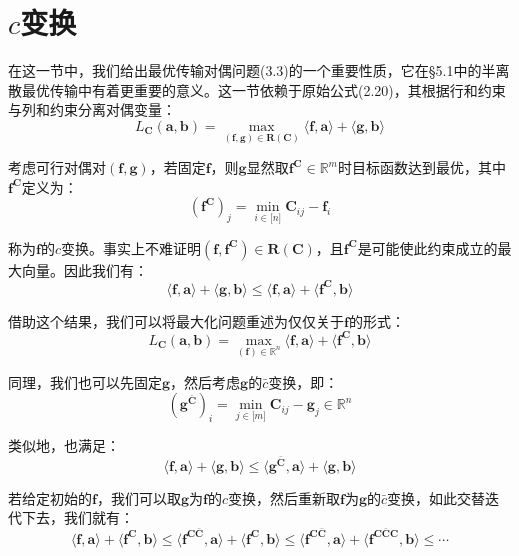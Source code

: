 \documentclass[cn,10pt,math=newtx,citestyle=gb7714-2015,bibstyle=gb7714-2015]{elegantbook}
\begin{document}
\section{$c$变换}

在这一节中，我们给出最优传输对偶问题(3.3)的一个重要性质，它在\S 5.1中的半离散最优传输中有着更重要的意义。这一节依赖于原始公式(2.20)，其根据行和约束与列和约束分离对偶变量：
\begin{equation}
    \label{3.4}
    L_\mathbf{C}(\mathbf{a,b})=\max\limits_{(\mathbf{f,g})\in\mathbf{R}(\mathbf{C})} \langle \mathbf{f,a}\rangle + \langle \mathbf{g,b} \rangle
\end{equation}

考虑可行对偶对$(\mathbf{f,g})$，若固定$\mathbf{f}$，则$\mathbf{g}$显然取$\mathbf{f^C}\in\mathbb{R}^m$时目标函数达到最优，其中$\mathbf{f^C}$定义为：
\begin{equation*}
    (\mathbf{f^C})_j=\min\limits_{i\in\mathbb{[}n\mathbb{]}}\mathbf{C}_{ij}-\mathbf{f}_i
\end{equation*}

称为$\mathbf{f}$的$c$变换。事实上不难证明$(\mathbf{f,f^C})\in\mathbf{R(C)}$，且$\mathbf{f^C}$是可能使此约束成立的最大向量。因此我们有：
\begin{equation*}
    \langle \mathbf{f,a}\rangle + \langle \mathbf{g,b} \rangle \leq \langle \mathbf{f,a}\rangle + \langle \mathbf{f^C,b} \rangle
\end{equation*}

借助这个结果，我们可以将最大化问题重述为仅仅关于$\mathbf{f}$的形式：
\begin{equation}
    \label{3.5}
    L_\mathbf{C}(\mathbf{a,b})=\max\limits_{(\mathbf{f})\in\mathbb{R}^n} \langle \mathbf{f,a}\rangle + \langle \mathbf{f^C,b} \rangle
\end{equation}

同理，我们也可以先固定$\mathbf{g}$，然后考虑$\mathbf{g}$的$\bar c$变换，即：
\begin{equation*}
    (\mathbf{g^{\bar C}})_i=\min\limits_{j\in\mathbb{[}m\mathbb{]}}\mathbf{C}_{ij}-\mathbf{g}_j\in\mathbb{R}^n
\end{equation*}

类似地，也满足：
\begin{equation*}
    \langle \mathbf{f,a}\rangle + \langle \mathbf{g,b} \rangle \leq \langle \mathbf{g^{\bar C},a}\rangle + \langle \mathbf{g,b} \rangle
\end{equation*}

若给定初始的$\mathbf{f}$，我们可以取$\mathbf{g}$为$\mathbf{f}$的$c$变换，然后重新取$\mathbf{f}$为$\mathbf{g}$的$\bar c$变换，如此交替迭代下去，我们就有：
\begin{equation*}
    \langle \mathbf{f,a}\rangle + \langle \mathbf{f^C,b} \rangle \leq \langle \mathbf{f^{C\bar C},a}\rangle + \langle \mathbf{f^C,b} \rangle \leq \langle \mathbf{f^{C \bar C},a}\rangle + \langle \mathbf{f^{C \bar{C} C},b} \rangle \leq \cdots
\end{equation*}
\end{document}
